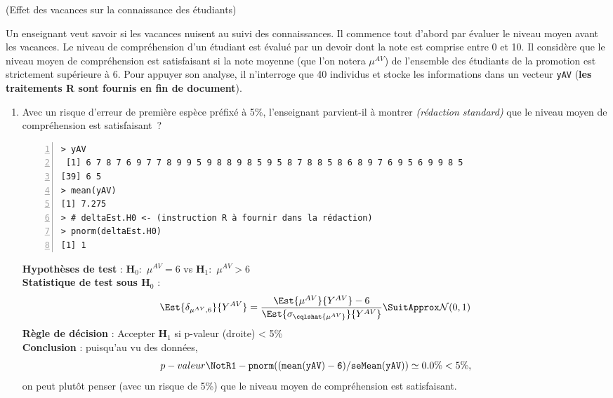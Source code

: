 \documentclass[10pt]{report}
\newcommand{\redstd}{\textit{(rédaction standard) }}
\begin{document}
\begin{exercice} (Effet des vacances sur la connaissance des étudiants)

Un enseignant veut savoir si les vacances nuisent au suivi des connaissances. Il commence tout d'abord par évaluer le niveau moyen avant les vacances. Le niveau de compréhension d'un étudiant est évalué par un devoir dont la note est comprise entre 0 et 10. Il consid{\`e}re que le niveau moyen de compréhension est satisfaisant si la note moyenne  (que l'on notera $\mu^{AV}$) de l'ensemble des étudiants de la promotion est strictement sup{\'e}rieure {\`a} 6. Pour appuyer son analyse, il n'interroge que 40 individus et stocke les informations dans un vecteur \texttt{yAV} (\textbf{les traitements R sont fournis en fin de document}).


\begin{enumerate}
\item 
Avec un risque d'erreur de premi{\`e}re esp{\`e}ce pr{\'e}fix{\'e} {\`a} 5\%, l'enseignant parvient-il {\`a} montrer \redstd que le niveau moyen de compréhension est satisfaisant~?

\IndicR
\begin{Verbatim}[frame=leftline,fontfamily=tt,fontshape=n,numbers=left]
> yAV
 [1] 6 7 8 7 6 9 7 7 8 9 9 5 9 8 8 9 8 5 9 5 8 7 8 8 5 8 6 8 9 7 6 9 5 6 9 9 8 5
[39] 6 5
> mean(yAV)
[1] 7.275
> # deltaEst.H0 <- (instruction R à fournir dans la rédaction)
> pnorm(deltaEst.H0)
[1] 1
\end{Verbatim}

 

\begin{Correction}

\noindent \textbf{Hypothèses de test} : $\mathbf{H}_0:$ $\mu^{AV}=6$ vs {\large $\mathbf{H}_1:$ $\mu^{AV}>6$}\\
\textbf{Statistique de test sous $\mathbf{H}_0$} :
  $$
  \Est{\delta_{\mu^{AV},6}}{Y^{AV}}= {\displaystyle \frac{\Est{\mu^{AV}}{Y^{AV}}-6}{
\Est{\sigma_{\cqlshat{\mu^{AV}}}}{Y^{AV}}
}} 
  \SuitApprox \mathcal{N}(0,1)
  $$
\textbf{Règle de décision} : Accepter $\mathbf{H}_1$ si 
  p-valeur (droite) < 5\%\\
\noindent \textbf{Conclusion} :
puisqu'au vu des données, 
  \[
p-valeur\NotR\mathtt{1-pnorm((mean(yAV)-6)/seMean(yAV))} \simeq 0.0\% < 5\%,
\]
on peut plutôt penser (avec un risque de 5\%) que le niveau moyen de compréhension  est satisfaisant.
\end{Correction}






\end{enumerate}
\end{exercice}
\end{document}
